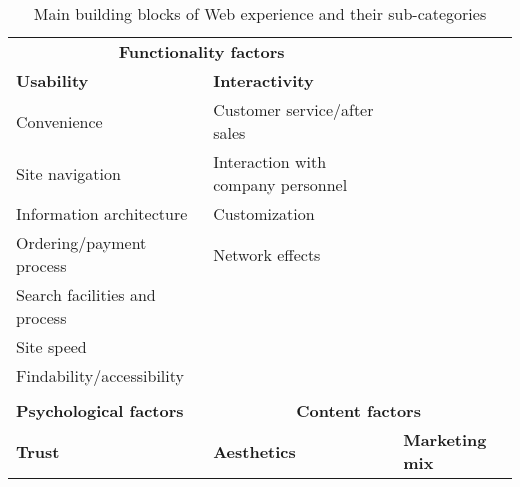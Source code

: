 \begin{table}[h]
    \centering
    \caption{Main building blocks of Web experience and their sub-categories 
    \cite{Constantinides2004}}
\label{tab:factors}
\begin{tabular}{lll}
    \cline{1-2}
    \multicolumn{2}{|c|}{\textbf{Functionality 
    factors}}                                               & 
    \textbf{}                                   \\ \cline{1-2}
    \multicolumn{1}{|l|}{\textbf{Usability}}             & 
    \multicolumn{1}{l|}{\textbf{Interactivity}} & 
    \textbf{}                                   \\ \cline{1-2}
    Convenience                                          & Customer 
    service/after sales                
    &                                             \\
    Site navigation                                      & Interaction with 
    company personnel          &                                             \\
    Information architecture                             & 
    Customization                               &                               
                  \\
    Ordering/payment process                             & Network 
    effects                             &                                       
          \\
    Search facilities and process                        
    &                                             &                             
                    \\
    Site speed                                           
    &                                             &                             
                    \\
    Findability/accessibility                            
    &                                             &                             
                    \\
    &                                             
    &                                             \\ \hline
    \multicolumn{1}{|l|}{\textbf{Psychological factors}} & 
    \multicolumn{2}{c|}{\textbf{Content 
    factors}}                                             \\ \hline
    \multicolumn{1}{|l|}{\textbf{Trust}}                 & 
    \multicolumn{1}{l|}{\textbf{Aesthetics}}    & 
    \multicolumn{1}{l|}{\textbf{Marketing mix}} \\ \hline

\end{tabular}
\end{table}
